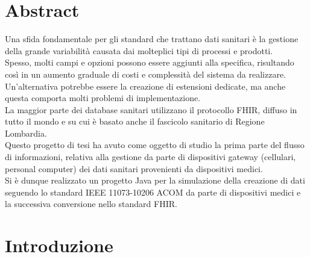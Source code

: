 \documentclass[a4paper]{article}
\begin{document}
\clearpage
\null
\thispagestyle{empty}

\clearpage
\section*{Abstract}
Una sfida fondamentale per gli standard che trattano dati sanitari è la gestione della grande variabilità causata dai molteplici tipi di processi e prodotti. \\
Spesso, molti campi e opzioni possono essere aggiunti alla specifica, risultando così in un aumento graduale di costi e complessità del sistema da realizzare. \\
Un'alternativa potrebbe essere la creazione di estensioni dedicate, ma anche questa comporta molti problemi di implementazione.
\\
La maggior parte dei database sanitari utilizzano il protocollo FHIR, diffuso in tutto il mondo e su cui è basato anche il fascicolo sanitario di Regione Lombardia. 
\\
Questo progetto di tesi ha avuto come oggetto di studio la prima parte del flusso di informazioni, relativa alla gestione da parte di dispositivi gateway (cellulari, personal computer) dei dati sanitari provenienti da dispositivi medici.\\
Si è dunque realizzato un progetto Java per la simulazione della creazione di dati seguendo lo standard IEEE 11073-10206 ACOM da parte di dispositivi medici e la successiva conversione nello standard FHIR.


\clearpage
\null
\thispagestyle{empty}

\clearpage

\tableofcontents
\newpage
\section{Introduzione}
\end{document}
